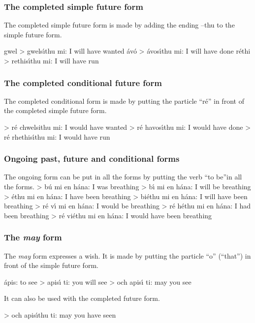 \subsubsection{The completed simple future form}

The completed simple future form is made by adding the ending –thu to the simple future form.

gwel > gwels\'{\i}thu mi: I will have wanted
\'{a}v\'{o} > \'{a}vos\'{\i}thu mi: I will have done
r\'{e}thi > rethis\'{\i}thu mi: I will have run

\subsubsection{The completed conditional future form}

The completed conditional form is made by putting the particle “r\'{e}” in front of the completed simple future form.

> r\'{e} chwelsithu mi: I would have wanted
> r\'{e} havos\'{\i}thu mi: I would have done
> r\'{e} rhethis\'{\i}thu mi: I would have run

\subsubsection{Ongoing past, future and conditional forms}

The ongoing form can be put in all the forms by putting the verb “to be”in all the forms.
> b\'{u} mi en h\'{a}na: I was breathing
> b\'{\i} mi en h\'{a}na: I will be breathing
> \'{e}thu mi en h\'{a}na: I have been breathing
> bi\'{e}thu mi en h\'{a}na: I will have been breathing
> r\'{e} v\'{\i} mi en h\'{a}na: I would be breathing
> r\'{e} h\'{e}thu mi en h\'{a}na: I had been breathing
> r\'{e} vi\'{e}thu mi en h\'{a}na: I would have been breathing

\subsubsection{The \textit{may} form}

The \textit{may} form expresses a wish. It is made by putting the particle “o” (“that”) in front of the simple future form.

\'{a}pis: to see
> apis\'{\i} ti: you will see
> och apis\'{\i} ti: may you see

It can also be used with the completed future form.

> och apis\'{\i}thu ti: may you have seen

